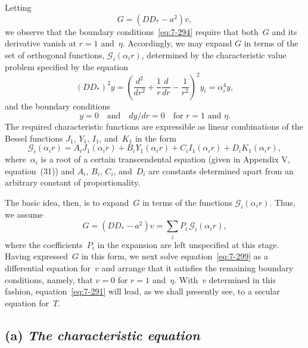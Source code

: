 Letting
\begin{equation}
\label{eq:7-295}
G = (DD_*-a^2)v,
\end{equation}
we observe that the boundary conditions~\eqref{eq:7-294} require that both~$G$
and its derivative vanish at $r = 1$ and~$\eta$.  Accordingly, we may expand
$G$ in terms of the set of orthogonal functions, $\mathscr{G}_i(\alpha_i r)$, determined by the
characteristic value problem specified by the equation
\begin{equation}
\label{eq:7-296}
(DD_*)^2 y = \left(\frac{d^2}{dr^2}+\frac{1}{r}\frac{d}{dr}-\frac{1}{r^2}\right)^2 y_i = \alpha_i^4 y,
\end{equation}
and the boundary conditions
\begin{equation}
\label{eq:7-297}
y = 0 \quad\text{and}\quad dy/dr = 0 \quad\text{for } r = 1 \text{ and } \eta.
\end{equation}
The required characteristic functions are expressible as linear combinations of the Bessel functions $J_1$, $Y_1$, $I_1$, and~$K_1$ in the form
\begin{equation}
\label{eq:7-298}
\mathscr{G}_i(\alpha_i r) = A_i J_1(\alpha_i r) + B_i Y_1(\alpha_i r) + C_i I_1(\alpha_i r)
  + D_i K_1(\alpha_i r),
\end{equation}
where~$\alpha_i$ is a root of a certain transcendental equation (given in Appendix
V, equation~(31)) and $A_i$, $B_i$, $C_i$, and~$D_i$ are constants determined apart
from an arbitrary constant of proportionality.

The basic idea, then, is to expand~$G$ in terms of the functions
$\mathscr{G}_i(\alpha_i r)$.  Thus, we assume
\begin{equation}
\label{eq:7-299}
G = (DD_*-a^2)v = \sum_i P_i\,\mathscr{G}_i(\alpha_i r),
\end{equation}
where the coefficients~$P_i$ in the expansion are left unspecified at this stage.
Having expressed~$G$ in this form, we next solve equation~\eqref{eq:7-299} as a
differential equation for~$v$ and arrange that it satisfies the remaining
boundary conditions, namely, that $v = 0$ for $r = 1$ and~$\eta$.  With~$v$
determined in this fashion, equation~\eqref{eq:7-291} will lead, as we shall presently
see, to a secular equation for~$T$.

\subsection*{(a) \textit{The characteristic equation}}

